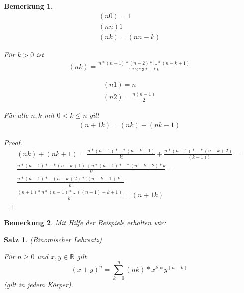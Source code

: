 \documentclass[a4paper,10pt]{article}
\newtheorem{notice}{Bemerkung}
\newtheorem{satz}{Satz}
\begin{document}
\begin{notice}
 \begin{align*}
  (n 0) = 1\\
  (n n) 1\\
  (n k) = (n n-k)
 \end{align*}
 
 Für $k > 0$ ist 
 \begin{align*}
  (n k) = \frac{n * (n - 1) * (n - 2) * \dots * (n - k + 1)}{1 * 2 * 3 * \dots * k}
 \end{align*}
 
 \begin{align*}
  (n 1) = n\\
  (n 2) = \frac{n(n - 1)}{2}
 \end{align*}
 
 Für alle $n, k$ mit $0 < k \le n$ gilt
 \begin{align*}
  (n+1 k) = (n k) + (n k-1)
 \end{align*}
\end{notice}

\begin{proof}
 \begin{align*}
  (n k) + (n k+1) = \frac{n * (n - 1) * \dots * (n - k + 1)}{k!} + \frac{n * (n - 1) * \dots * (n - k + 2)}{(k - 1)!} =\\
  \frac{n * (n - 1) * \dots * (n - k + 1) + n * (n - 1) * \dots * (n - k + 2) * k}{k!} =\\
  \frac{n * (n - 1) * \dots (n - k + 2) * ((n -k + 1 + k)}{k!} =\\
  \frac{(n + 1) * n * (n - 1) * \dots ((n + 1) - k + 1)}{k!} = (n+1 k)
 \end{align*}
\end{proof}

\begin{notice}
 Mit Hilfe der Beispiele erhalten wir: 
\end{notice}

\begin{satz}
 (Binomischer Lehrsatz)
 
 Für $n \ge 0$ und $x, y \in \mathbb{R}$ gilt
 \begin{equation*}
  (x + y)^n = \sum_{k = 0}^n (n k) * x^k * y^(n - k)
 \end{equation*}
 (gilt in jedem Körper).
\end{satz}
\end{document}

